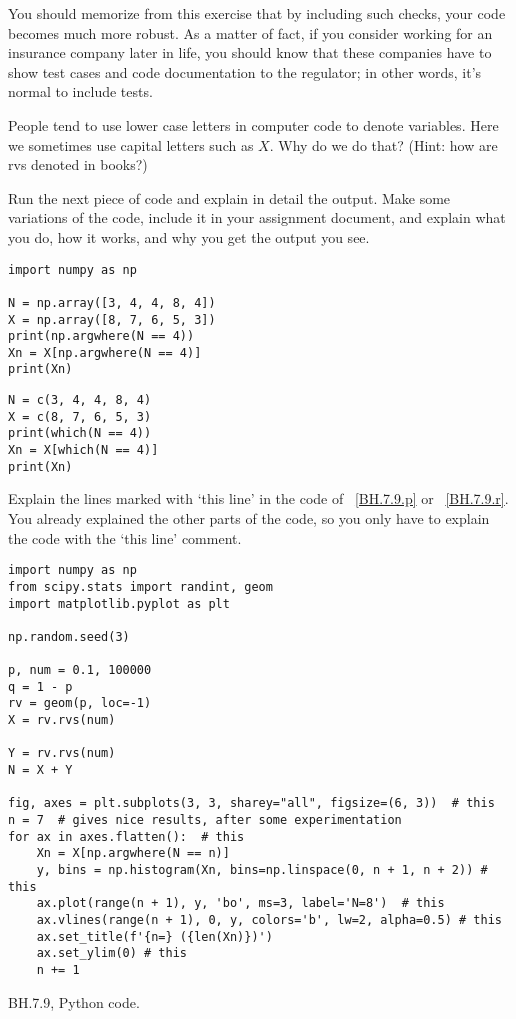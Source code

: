You should memorize from this exercise that by including such checks, your code becomes much more robust.
As a matter of fact, if you consider working for an insurance company later in life, you should know that these companies have to show test cases and code documentation to the regulator; in other words, it's normal to include tests.

\begin{exercise}
People tend to use lower case letters in computer code to denote variables. Here we sometimes use capital letters such as $X$. Why do we do that? (Hint: how are rvs denoted in books?)
\end{exercise}


\begin{exercise}
Run the next piece of code and explain in detail the output. Make some variations of the code, include it in your assignment document, and explain what you do, how it works, and why you get the output you see.

\begin{verbatim}
import numpy as np

N = np.array([3, 4, 4, 8, 4])
X = np.array([8, 7, 6, 5, 3])
print(np.argwhere(N == 4))
Xn = X[np.argwhere(N == 4)]
print(Xn)
\end{verbatim}

\begin{verbatim}
N = c(3, 4, 4, 8, 4)
X = c(8, 7, 6, 5, 3)
print(which(N == 4))
Xn = X[which(N == 4)]
print(Xn)
\end{verbatim}
\end{exercise}

\begin{exercise}
Explain the lines marked with `this line' in the code of ~\cref{BH.7.9.p} or ~\cref{BH.7.9.r}.
You already explained the other parts of the code, so you only have to explain the code with the `this line' comment.
\end{exercise}


\begin{listing}[!ht]
\begin{verbatim}
import numpy as np
from scipy.stats import randint, geom
import matplotlib.pyplot as plt

np.random.seed(3)

p, num = 0.1, 100000
q = 1 - p
rv = geom(p, loc=-1)
X = rv.rvs(num)

Y = rv.rvs(num)
N = X + Y

fig, axes = plt.subplots(3, 3, sharey="all", figsize=(6, 3))  # this
n = 7  # gives nice results, after some experimentation
for ax in axes.flatten():  # this
    Xn = X[np.argwhere(N == n)]
    y, bins = np.histogram(Xn, bins=np.linspace(0, n + 1, n + 2)) # this
    ax.plot(range(n + 1), y, 'bo', ms=3, label='N=8')  # this
    ax.vlines(range(n + 1), 0, y, colors='b', lw=2, alpha=0.5) # this
    ax.set_title(f'{n=} ({len(Xn)})')
    ax.set_ylim(0) # this
    n += 1
\end{verbatim}
\caption{BH.7.9, Python code.}
\label{BH.7.9.p}
\end{listing}


